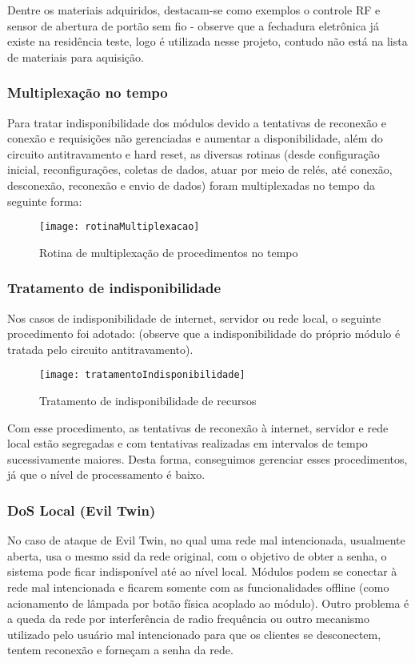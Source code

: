 Dentre os materiais adquiridos, destacam-se como exemplos o controle RF  e sensor de abertura de portão sem fio - observe que a fechadura eletrônica já existe na residência teste, logo é utilizada nesse projeto, contudo não está na lista de materiais para aquisição.

\subsubsection{Multiplexação no tempo}
Para tratar indisponibilidade dos módulos devido a tentativas de reconexão e conexão e requisições não gerenciadas e aumentar a disponibilidade, além do circuito antitravamento e hard reset, as diversas rotinas (desde configuração inicial, reconfigurações, coletas de dados, atuar por meio de relés, até conexão, desconexão, reconexão e envio de dados) foram multiplexadas no tempo da seguinte forma:

\begin{figure}[H]
	\centering
	\caption{Rotina de multiplexação de procedimentos no tempo}
  \texttt{[image: rotinaMultiplexacao]}
\label{fig:rotinaMultiplexacao}
\end{figure}

\subsubsection{Tratamento de indisponibilidade}
Nos casos de indisponibilidade de internet, servidor ou rede local, o seguinte procedimento foi adotado: (observe que a indisponibilidade do próprio módulo é tratada pelo circuito antitravamento).

\begin{figure}[H]
	\centering
	\caption{Tratamento de indisponibilidade de recursos}
  \texttt{[image: tratamentoIndisponibilidade]}
\label{fig:tratamentoIndisponibilidade}
\end{figure}

Com esse procedimento, as tentativas de reconexão à internet, servidor e rede local estão segregadas e com tentativas realizadas em intervalos de tempo sucessivamente maiores. Desta forma, conseguimos gerenciar esses procedimentos, já que o nível de processamento é baixo.

\subsubsection{DoS Local (Evil Twin)}
No caso de ataque de Evil Twin, no qual uma rede mal intencionada, usualmente aberta, usa o mesmo ssid da rede original, com o objetivo de obter a senha, o sistema pode ficar indisponível até ao nível local. Módulos podem se conectar à rede mal intencionada e ficarem somente com as funcionalidades offline (como acionamento de lâmpada por botão física acoplado ao módulo). Outro problema é a queda da rede por interferência de radio frequência ou outro mecanismo utilizado pelo usuário mal intencionado para que os clientes se desconectem, tentem reconexão e forneçam a senha da rede.

